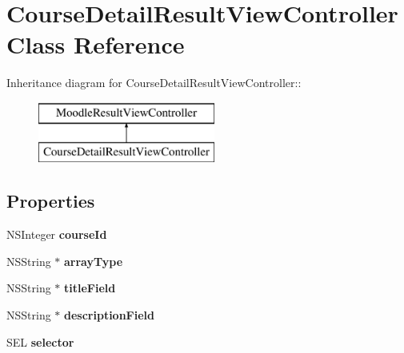 \hypertarget{interface_course_detail_result_view_controller}{
\section{CourseDetailResultViewController Class Reference}
\label{interface_course_detail_result_view_controller}
}
Inheritance diagram for CourseDetailResultViewController::\begin{figure}[H]
\begin{center}
\leavevmode
\includegraphics[height=2cm]{interface_course_detail_result_view_controller}
\end{center}
\end{figure}
\subsection*{Properties}
\begin{DoxyCompactItemize}
\item 
\hypertarget{interface_course_detail_result_view_controller_a6141decec3b3c678fc955951df005f6e}{
NSInteger {\bfseries courseId}}
\label{interface_course_detail_result_view_controller_a6141decec3b3c678fc955951df005f6e}

\item 
\hypertarget{interface_course_detail_result_view_controller_ae56bd1e088380f2fcd51d04f4671ea65}{
NSString $\ast$ {\bfseries arrayType}}
\label{interface_course_detail_result_view_controller_ae56bd1e088380f2fcd51d04f4671ea65}

\item 
\hypertarget{interface_course_detail_result_view_controller_a4b3d00185a4fe9a94d24fd61fb15bf2e}{
NSString $\ast$ {\bfseries titleField}}
\label{interface_course_detail_result_view_controller_a4b3d00185a4fe9a94d24fd61fb15bf2e}

\item 
\hypertarget{interface_course_detail_result_view_controller_ae6c3e2f15fef7660dcd6b2d957f6e078}{
NSString $\ast$ {\bfseries descriptionField}}
\label{interface_course_detail_result_view_controller_ae6c3e2f15fef7660dcd6b2d957f6e078}

\item 
\hypertarget{interface_course_detail_result_view_controller_ad8b5087b4e96cfe5ce4de3616a6ed33b}{
SEL {\bfseries selector}}
\label{interface_course_detail_result_view_controller_ad8b5087b4e96cfe5ce4de3616a6ed33b}

\end{DoxyCompactItemize}


